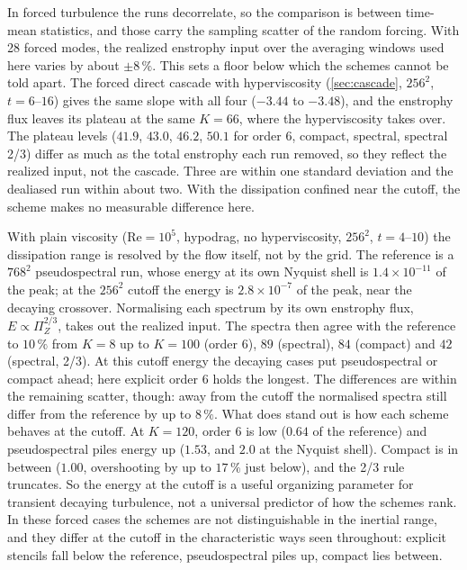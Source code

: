 \documentclass[11pt,a4paper]{article}
\newcommand{\Rey}{\mathrm{Re}}
\begin{document}
In forced turbulence the runs decorrelate, so the comparison is between time-mean statistics, and those carry the sampling scatter of the random forcing.  With 28 forced modes, the realized enstrophy input over the averaging windows used here varies by about $\pm8\,\%$.  This sets a floor below which the schemes cannot be told apart.  The forced direct cascade with hyperviscosity (\cref{sec:cascade}, $256^2$, $t=6$--$16$) gives the same slope with all four ($-3.44$ to $-3.48$), and the enstrophy flux leaves its plateau at the same $K=66$, where the hyperviscosity takes over.  The plateau levels ($41.9$, $43.0$, $46.2$, $50.1$ for order 6, compact, spectral, spectral 2/3) differ as much as the total enstrophy each run removed, so they reflect the realized input, not the cascade.  Three are within one standard deviation and the dealiased run within about two.  With the dissipation confined near the cutoff, the scheme makes no measurable difference here.

With plain viscosity ($\Rey=10^5$, hypodrag, no hyperviscosity, $256^2$, $t=4$--$10$) the dissipation range is resolved by the flow itself, not by the grid.  The reference is a $768^2$ pseudospectral run, whose energy at its own Nyquist shell is $1.4\times10^{-11}$ of the peak; at the $256^2$ cutoff the energy is $2.8\times10^{-7}$ of the peak, near the decaying crossover.  Normalising each spectrum by its own enstrophy flux, $E\propto\Pi_Z^{2/3}$, takes out the realized input.  The spectra then agree with the reference to $10\,\%$ from $K=8$ up to $K=100$ (order 6), $89$ (spectral), $84$ (compact) and $42$ (spectral, 2/3).  At this cutoff energy the decaying cases put pseudospectral or compact ahead; here explicit order 6 holds the longest.  The differences are within the remaining scatter, though: away from the cutoff the normalised spectra still differ from the reference by up to $8\,\%$.  What does stand out is how each scheme behaves at the cutoff.  At $K=120$, order 6 is low ($0.64$ of the reference) and pseudospectral piles energy up ($1.53$, and $2.0$ at the Nyquist shell).  Compact is in between ($1.00$, overshooting by up to $17\,\%$ just below), and the 2/3 rule truncates.  So the energy at the cutoff is a useful organizing parameter for transient decaying turbulence, not a universal predictor of how the schemes rank.  In these forced cases the schemes are not distinguishable in the inertial range, and they differ at the cutoff in the characteristic ways seen throughout: explicit stencils fall below the reference, pseudospectral piles up, compact lies between.
\end{document}
